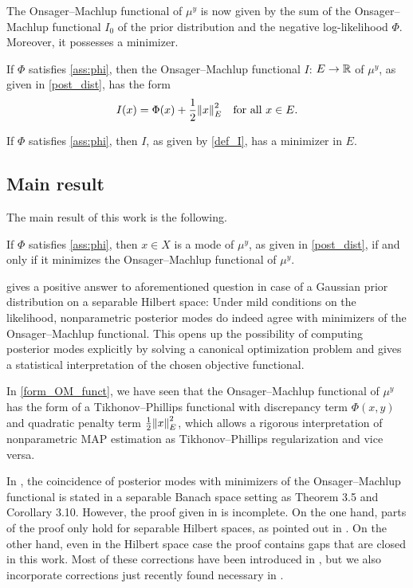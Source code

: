 \documentclass[english]{jnsao}
\theoremstyle{definition}
\begin{document}
The Onsager--Machlup functional of $\mu^y$ is now given by the sum of the Onsager--Machlup functional $I_0$ of the prior distribution and the negative log-likelihood $\Phi$. Moreover, it possesses a minimizer.
\begin{proposition}
	\label{form_OM_funct}
	If $\Phi$ satisfies \cref{ass:phi}, then the Onsager--Machlup functional $I$: $E \to {\mathbb{R}}$ of $\mu^y$, as given in \eqref{post_dist}, has the form
	\begin{equation}
		\label{def_I}
		I(x) = \Phi(x) + \frac12{\lVert x\rVert}_E^2 \quad\text{for all}~x \in E.
	\end{equation}
\end{proposition}

\begin{proposition}
	\label{min_I_ex}
	If $\Phi$ satisfies \cref{ass:phi}, then $I$, as given by \eqref{def_I}, has a minimizer in $E$.
\end{proposition}

\subsection{Main result}
\label{sect_main_res}

The main result of this work is the following.
\begin{theorem} 
	\label{var_char_modes}
	If $\Phi$ satisfies \cref{ass:phi}, then $x \in X$ is a mode of $\mu^y$, as given in \eqref{post_dist}, if and only if it minimizes the Onsager--Machlup functional of $\mu^y$.
\end{theorem}

 gives a positive answer to aforementioned question in case of a Gaussian prior distribution on a separable Hilbert space: Under mild conditions on the likelihood, nonparametric posterior modes do indeed agree with minimizers of the Onsager--Machlup functional. This opens up the possibility of computing posterior modes explicitly by solving a canonical optimization problem and gives a statistical interpretation of the chosen objective functional.

In \cref{form_OM_funct}, we have seen that the Onsager--Machlup functional of $\mu^y$ has the form of a Tikhonov--Phillips functional with discrepancy term $\Phi(x,y)$ and quadratic penalty term $\frac12{\lVert x\rVert}_E^2$, which allows a rigorous interpretation of nonparametric MAP estimation as Tikhonov--Phillips regularization and vice versa.

In \cite{Dashti:2013}, the coincidence of posterior modes with minimizers of the Onsager--Machlup functional is stated in a separable Banach space setting as Theorem 3.5 and Corollary 3.10. However, the proof given in \cite{Dashti:2013} is incomplete. On the one hand, parts of the proof only hold for separable Hilbert spaces, as pointed out in \cite{wacker2020map}. On the other hand, even in the Hilbert space case the proof contains gaps that are closed in this work. Most of these corrections have been introduced in \cite{Kretschmann:2019}, but we also incorporate corrections just recently found necessary in \cite{klebanov2022}.
\end{document}
